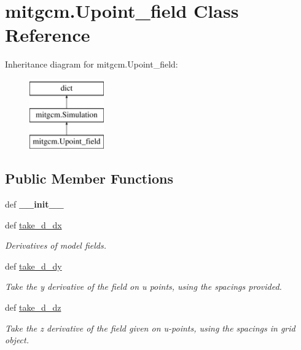 \hypertarget{classmitgcm_1_1Upoint__field}{\section{mitgcm.\+Upoint\+\_\+field Class Reference}
\label{classmitgcm_1_1Upoint__field}
}
Inheritance diagram for mitgcm.\+Upoint\+\_\+field\+:\begin{figure}[H]
\begin{center}
\leavevmode
\includegraphics[height=3.000000cm]{classmitgcm_1_1Upoint__field}
\end{center}
\end{figure}
\subsection*{Public Member Functions}
\begin{DoxyCompactItemize}
\item 
\hypertarget{classmitgcm_1_1Upoint__field_a06ba9789b45d356bd51bdfe8f3b9e155}{def {\bfseries \+\_\+\+\_\+init\+\_\+\+\_\+}}\label{classmitgcm_1_1Upoint__field_a06ba9789b45d356bd51bdfe8f3b9e155}

\item 
def \hyperlink{classmitgcm_1_1Upoint__field_a3f136fd99e5a7ce04aef0f216bd32019}{take\+\_\+d\+\_\+dx}
\begin{DoxyCompactList}\small\item\em Derivatives of model fields. \end{DoxyCompactList}\item 
def \hyperlink{classmitgcm_1_1Upoint__field_acf9bf315e3d31834781c0642086a7802}{take\+\_\+d\+\_\+dy}
\begin{DoxyCompactList}\small\item\em Take the y derivative of the field on u points, using the spacings provided. \end{DoxyCompactList}\item 
def \hyperlink{classmitgcm_1_1Upoint__field_a8bfdba5354910eed3e9e8827d38608f8}{take\+\_\+d\+\_\+dz}
\begin{DoxyCompactList}\small\item\em Take the z derivative of the field given on u-\/points, using the spacings in grid object. \end{DoxyCompactList}\end{DoxyCompactItemize}
